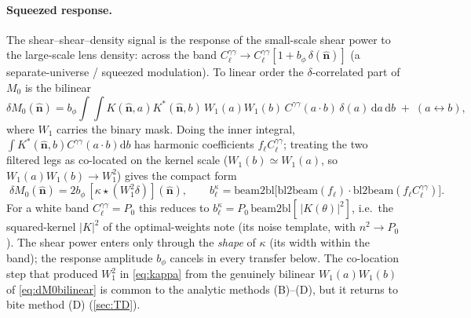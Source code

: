 \documentclass[11pt]{article}
\newcommand{\nv}{\hat{\boldsymbol{n}}}
\newcommand{\Wone}{W_1}
\newcommand{\dt}{\delta}
\newcommand{\diff}{\mathrm{d}}
\begin{document}
\paragraph{Squeezed response.}
The shear--shear--density signal is the response of the small-scale shear power
to the large-scale lens density: across the band $C^{\gamma\gamma}_\ell\to
C^{\gamma\gamma}_\ell[1+b_\phi\,\dt(\nv)]$ (a separate-universe / squeezed
modulation). To linear order the $\dt$-correlated part of $M_0$ is the bilinear
\begin{equation}
\delta M_0(\nv)=b_\phi\!\int\!\!\int K(\nv,a)K^*(\nv,b)\,\Wone(a)\Wone(b)\,
C^{\gamma\gamma}(a\!\cdot\!b)\,\dt(a)\,\diff a\,\diff b\;+\;(a\!\leftrightarrow\!b),
\label{eq:dM0bilinear}
\end{equation}
where $\Wone$ carries the binary mask. Doing the inner integral,
$\int K^*(\nv,b)C^{\gamma\gamma}(a\!\cdot\!b)\diff b$ has harmonic coefficients
$f_\ell C^{\gamma\gamma}_\ell$; treating the two filtered legs as co-located on
the kernel scale ($\Wone(b)\!\simeq\!\Wone(a)$, so
$\Wone(a)\Wone(b)\!\to\!\Wone^2$) gives the compact form
\begin{equation}
\boxed{\;\delta M_0(\nv)=2b_\phi\,[\kappa\star(\Wone^2\dt)](\nv),\qquad
b^\kappa_\ell=\mathrm{beam2bl}\!\big[\mathrm{bl2beam}(f_\ell)\cdot
\mathrm{bl2beam}(f_\ell C^{\gamma\gamma}_\ell)\big].\;}
\label{eq:kappa}
\end{equation}
For a white band $C^{\gamma\gamma}_\ell=P_0$ this reduces to
$b^\kappa_\ell=P_0\,\mathrm{beam2bl}[\,|K(\theta)|^2]$, i.e.\ the squared-kernel
$|K|^2$ of the optimal-weights note (its noise template, with $n^2\!\to\!P_0$).
The shear power enters only through the \emph{shape} of $\kappa$ (its width
within the band); the response amplitude $b_\phi$ cancels in every transfer
below. The co-location step that produced $\Wone^2$ in \cref{eq:kappa} from the
genuinely bilinear $\Wone(a)\Wone(b)$ of \cref{eq:dM0bilinear} is common to the
analytic methods (B)--(D), but it returns to bite method (D) (\cref{sec:TD}).
\end{document}
